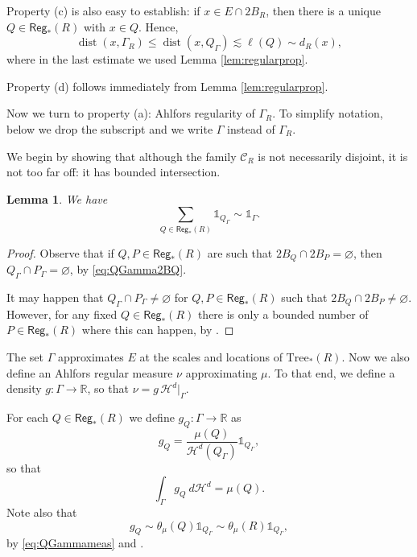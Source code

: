 \documentclass[11pt,reqno]{amsart}
\newcommand{\Tr}{\mathrm{Tree}}
\def\cC{{\mathscr{C}}}
\def\one{\mathds{1}}
\def\dist{\mathop\mathrm{dist}} 						%
\newcommand{\fr}[2]{\frac{#1}{#2}}
\newtheorem{lemma}[theorem]{Lemma}
\theoremstyle{definition}
\theoremstyle{remark}
\numberwithin{equation}{section}
\newcommand{\R}{\mathbb{R}}
\newcommand{\hd}{\mathcal{H}^d}
\newcommand{\Reg}{\mathsf{Reg}_*}
\theoremstyle{theorem}
\theoremstyle{definition}
\theoremstyle{remark}
\numberwithin{equation}{section}
\begin{document}
    Property (c) is also easy to establish: if $x\in E\cap 2B_R$, then there is a unique $Q\in\Reg(R)$ with $x\in Q$. Hence,
    \begin{equation*}
        \dist(x,\Gamma_R)\le \dist(x,Q_\Gamma) \lesssim \ell(Q) \sim d_R(x),
    \end{equation*}
    where in the last estimate we used Lemma \ref{lem:regularprop}. 
    
    Property (d) follows immediately from Lemma \ref{lem:regularprop}.
    
 Now we turn to property (a): Ahlfors regularity of $\Gamma_R$. To simplify notation, below we drop the subscript and we write $\Gamma$ instead of $\Gamma_R$.

    We begin by showing that although the family $\cC_R$ is not necessarily disjoint, it is not too far off: it has bounded intersection.
	\begin{lemma}
		We have
		\begin{equation}\label{eq:sumoneQ}
		\sum_{Q\in\Reg(R)}\one_{Q_\Gamma} \sim \one_\Gamma.
		\end{equation}
	\end{lemma}
	\begin{proof}
		Observe that if $Q,P\in\Reg(R)$ are such that $2B_Q\cap 2B_P=\varnothing$, then $Q_\Gamma\cap P_\Gamma=\varnothing$, by \eqref{eq:QGamma2BQ}. 
		
		It may happen that $Q_\Gamma\cap P_\Gamma\neq\varnothing$ for $Q,P\in\Reg(R)$ such that $2B_Q\cap2B_P\neq\varnothing$. However, for any fixed $Q\in\Reg(R)$ there is only a bounded number of $P\in\Reg(R)$ where this can happen, by .
	\end{proof}
	
	The set $\Gamma$ approximates $E$ at the scales and locations of $\Tr_*(R)$. Now we also define an Ahlfors regular measure $\nu$ approximating $\mu$. To that end, we define a density $g:\Gamma\to\R$, so that $\nu=g\,\hd|_\Gamma$.
	
	For each $Q\in\Reg(R)$ we define $g_Q:\Gamma\to \R$ as
	\begin{equation*}
	g_Q = \fr{\mu(Q)}{\hd(Q_\Gamma)}\one_{Q_\Gamma},
	\end{equation*}
	so that
	\begin{equation}\label{eq:gQmeas}
	\int_\Gamma g_Q\ d\hd = \mu(Q).
	\end{equation}
	Note also that 
	\begin{equation}\label{eq:gQsimtheta}
	g_Q\sim \theta_\mu(Q)\one_{Q_\Gamma}\sim \theta_\mu(R)\one_{Q_\Gamma},
	\end{equation}
	by \eqref{eq:QGammameas} and .
	
\end{document}
